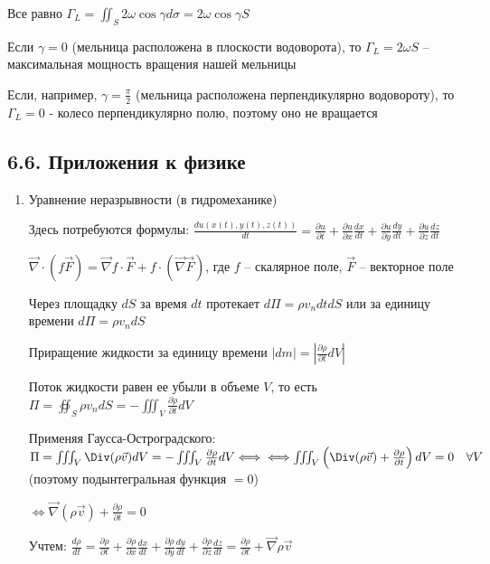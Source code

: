 \documentclass[12pt]{article}
\begin{document}
    Все равно $\Gamma_L = \iint_S 2\omega \cos \gamma d\sigma = 2\omega\cos \gamma S$

    Если $\gamma = 0$ (мельница расположена в плоскости водоворота), то $\Gamma_L = 2\omega S$ -- максимальная мощность вращения нашей мельницы

    Если, например, $\gamma = \frac{\pi}{2}$ (мельница расположена перпендикулярно водовороту), то $\Gamma_L = 0$ - колесо перпендикулярно полю, поэтому оно не вращается

    \subsection{6.6. Приложения к физике}

    \begin{enumerate}[label*=\arabic** ]
        \item Уравнение неразрывности (в гидромеханике)

        \Nota Здесь потребуются формулы:
        $\frac{du(x(t), y(t), z(t))}{dt} = \frac{\partial u}{\partial t} + \frac{\partial u}{\partial x}\frac{dx}{dt} + \frac{\partial u}{\partial y}\frac{dy}{dt} + \frac{\partial u}{\partial z}\frac{dz}{dt}$

        $\vec\nabla \cdot (f\vec{F}) = \vec\nabla f \cdot \vec{F} + f \cdot (\vec\nabla \vec{F})$, где $f$ -- скалярное поле, $\vec{F}$ -- векторное поле


        Через площадку $dS$ за время $dt$ протекает $d\Pi = \rho v_n dt dS$ или за единицу времени $d\Pi = \rho v_n dS$

        Приращение жидкости за единицу времени $|dm| = \left|\frac{\partial \rho}{\partial t} dV\right|$

        Поток жидкости равен ее убыли в объеме $V$, то есть $\Pi = \oiint_S \rho v_n dS = -\iiint_V \frac{\partial \rho}{\partial t} dV$

        Применяя \Ths Гаусса-Остроградского: $\Pi = \iiint_V \Div (\rho \vec{v}) dV = -\iiint_V \frac{\partial \rho}{\partial t} dV \Longleftrightarrow \\
        \Longleftrightarrow \iiint_V \left(\Div (\rho \vec{v}) + \frac{\partial \rho}{\partial t}\right) dV = 0 \quad \forall V$ (поэтому подынтегральная функция $= 0$)

        $\Longleftrightarrow \vec\nabla (\rho \vec{v}) + \frac{\partial \rho}{\partial t} = 0$

        Учтем: $\frac{d \rho}{dt} = \frac{\partial \rho}{\partial t} +  \frac{\partial \rho}{\partial x} \frac{dx}{dt} +  \frac{\partial \rho}{\partial y} \frac{dy}{dt} + \frac{\partial \rho}{\partial z} \frac{dz}{dt} = \frac{\partial \rho}{\partial t} + \vec\nabla \rho \vec{v}$


\end{enumerate}
\end{document}
